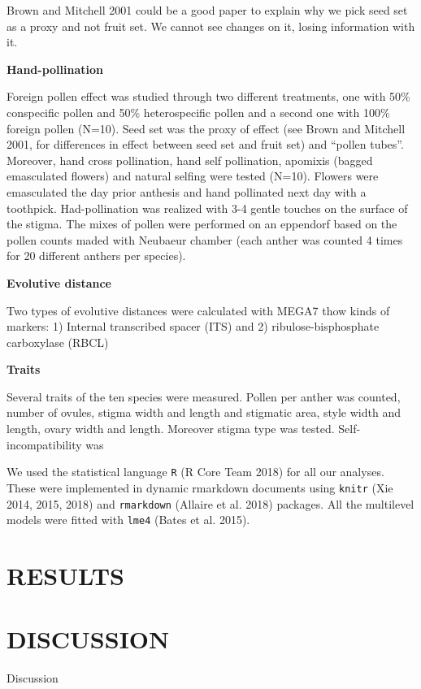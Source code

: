 \documentclass[11pt,a4paper]{article}
\begin{document}
Brown and Mitchell 2001 could be a good paper to explain why we pick
seed set as a proxy and not fruit set. We cannot see changes on it,
losing information with it.

\textbf{Hand-pollination}

Foreign pollen effect was studied through two different treatments, one
with 50\% conspecific pollen and 50\% heterospecific pollen and a second
one with 100\% foreign pollen (N=10). Seed set was the proxy of effect
(see Brown and Mitchell 2001, for differences in effect between seed set
and fruit set) and ``pollen tubes''. Moreover, hand cross pollination,
hand self pollination, apomixis (bagged emasculated flowers) and natural
selfing were tested (N=10). Flowers were emasculated the day prior
anthesis and hand pollinated next day with a toothpick. Had-pollination
was realized with 3-4 gentle touches on the surface of the stigma. The
mixes of pollen were performed on an eppendorf based on the pollen
counts maded with Neubaeur chamber (each anther was counted 4 times for
20 different anthers per species).

\textbf{Evolutive distance}

Two types of evolutive distances were calculated with MEGA7 thow kinds
of markers: 1) Internal transcribed spacer (ITS) and 2)
ribulose-bisphosphate carboxylase (RBCL)

\textbf{Traits}

Several traits of the ten species were measured. Pollen per anther was
counted, number of ovules, stigma width and length and stigmatic area,
style width and length, ovary width and length. Moreover stigma type was
tested. Self-incompatibility was

We used the statistical language \texttt{R} (R Core Team 2018) for all
our analyses. These were implemented in dynamic rmarkdown documents
using \texttt{knitr} (Xie 2014, 2015, 2018) and \texttt{rmarkdown}
(Allaire et al. 2018) packages. All the multilevel models were fitted
with \texttt{lme4} (Bates et al. 2015).

\section{RESULTS}\label{results}

\section{DISCUSSION}\label{discussion}

Discussion
\end{document}
